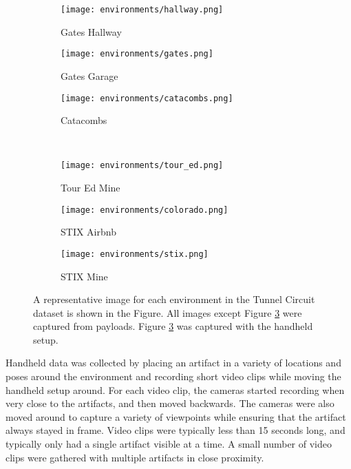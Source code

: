 \begin{figure}
	\centering
	\begin{subfigure}{0.3\textwidth}
		\texttt{[image: environments/hallway.png]}
		\caption{Gates Hallway}
		\label{environment_hallway}
	\end{subfigure}		
	\hfill
	\begin{subfigure}{0.3\textwidth}
		\texttt{[image: environments/gates.png]}
		\caption{Gates Garage}
		\label{environment_gates}		
	\end{subfigure}
	\hfill
	\begin{subfigure}{0.3\textwidth}
		\texttt{[image: environments/catacombs.png]}
		\caption{Catacombs}
		\label{environment_catacombs}
	\end{subfigure}
	\\
	\begin{subfigure}{0.3\textwidth}
		\texttt{[image: environments/tour\_ed.png]}
		\caption{Tour Ed Mine}
		\label{environment_tour_ed}
	\end{subfigure}		
	\hfill
	\begin{subfigure}{0.3\textwidth}
		\texttt{[image: environments/colorado.png]}
		\caption{STIX Airbnb}
		\label{environment_colorado}		
	\end{subfigure}
	\hfill
	\begin{subfigure}{0.3\textwidth}
		\texttt{[image: environments/stix.png]}
		\caption{STIX Mine}
		\label{environment_stix}
	\end{subfigure}	
	\caption[Representative dataset collection environment images]{A representative image for each environment in the Tunnel Circuit dataset is shown in the Figure. All images except Figure \ref{environment_catacombs} were captured from payloads. Figure \ref{environment_catacombs} was captured with the handheld setup.}
	\label{environments}
\end{figure}

Handheld data was collected by placing an artifact in a variety of locations and poses around the environment and recording short video clips while moving the handheld setup around. For each video clip, the cameras started recording when very close to the artifacts, and then moved backwards. The cameras were also moved around to capture a variety of viewpoints while ensuring that the artifact always stayed in frame. Video clips were typically less than 15 seconds long, and typically only had a single artifact visible at a time. A small number of video clips were gathered with multiple artifacts in close proximity.


